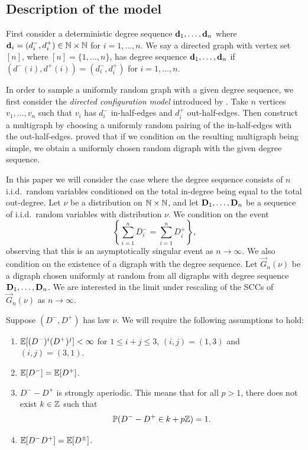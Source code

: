 \subsection{Description of the model}

\label{subsec:model-description}

First consider a deterministic degree sequence ${\mathbf d}_1, \ldots, {\mathbf d}_n$ where ${\mathbf d}_i = (d_i^-, d_i^+)\in {\mathbb N} \times {\mathbb N}$ for $i = 1, \ldots, n$. We say a directed graph with vertex set $[n]$, where $[n] = \{1,\dots,n\}$, has degree sequence ${\mathbf d}_1, \ldots, {\mathbf d}_n$ if $(d^-(i), d^+(i)) = (d_i^-, d_i^+)$ for $i = 1, \ldots, n$.

In order to sample a uniformly random graph with a given degree sequence, we first consider the \emph{directed configuration model} introduced by \citet{cooperSizeLargestStrongly2004}. Take $n$ vertices $v_1, \ldots, v_n$ such that $v_i$ has $d^-_i$ in-half-edges and $d^+_i$ out-half-edges. Then construct a multigraph by choosing a uniformly random pairing of the in-half-edges with the out-half-edges. \citet[Sec.\ 2.1]{cooperSizeLargestStrongly2004} proved that if we condition on the resulting multigraph being simple, we obtain a uniformly chosen random digraph with the given degree sequence.

In this paper we will consider the case where the degree sequence  consists of $n$ i.i.d.\ random variables conditioned on the total in-degree being equal to the total out-degree. Let $\nu$ be a distribution on ${\mathbb N} \times {\mathbb N}$, and let ${\mathbf D}_1, \ldots, {\mathbf D}_n$ be a sequence of i.i.d.\ random variables with distribution $\nu$. We condition on the event
\begin{equation*}
    \left\{ \textstyle \sum_{i=1}^n D_i^- = \sum_{i=1}^n D_i^+ \right\},
\end{equation*}
observing that this is an asymptotically singular event as $n\to\infty$. We also condition on the existence of a digraph with the degree sequence. Let $\vec{G}_n(\nu)$ be a digraph chosen uniformly at random from all digraphs with degree sequence ${\mathbf D}_1, \ldots, {\mathbf D}_n$. We are interested in the limit under rescaling of the SCCs of $\vec{G}_n(\nu)$ as $n\to \infty$.

Suppose $(D^-, D^+)$ has law $\nu$. We will require the following assumptions to hold:
\begin{enumerate}
    \item ${\mathbb E}[(D^-)^i(D^+)^j]< \infty$ for $1 \leq i+j\leq 3$, $(i, j) = (1, 3)$ and $(i, j) = (3, 1)$.
    \item ${\mathbb E}[D^-] = {\mathbb E}[D^+]$.
    \item $D^- - D^+$ is strongly aperiodic. This means that for all $p > 1$, there does not exist $k \in {\mathbb Z}$ such that 
    \begin{equation*}
        {\mathbb P}(D^- - D^+ \in k + p{\mathbb Z}) = 1.
    \end{equation*}
    \item ${\mathbb E}[D^-D^+] = {\mathbb E}[D^{\pm}]$.
\end{enumerate}

